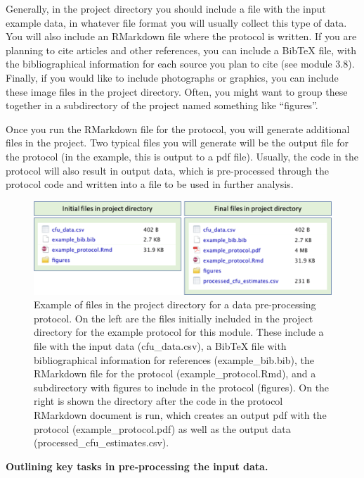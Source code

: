 \documentclass[]{tufte-book}
\begin{document}
Generally, in the project directory you should include a file with the input
example data, in whatever file format you will usually collect this type of
data. You will also include an RMarkdown file where the protocol is written. If
you are planning to cite articles and other references, you can include a BibTeX
file, with the bibliographical information for each source you plan to cite (see module 3.8).
Finally, if you would like to include photographs or graphics, you can include
these image files in the project directory. Often, you might want to group these
together in a subdirectory of the project named something like ``figures''.

Once you run the RMarkdown file for the protocol, you will generate additional
files in the project. Two typical files you will generate will be the output
file for the protocol (in the example, this is output to a pdf file). Usually,
the code in the protocol will also result in output data, which is pre-processed
through the protocol code and written into a file to be used in further
analysis.

\begin{figure}
\includegraphics[width=\textwidth]{figures/protocol_project_files} \caption[Example of files in the project directory for a data pre-processing protocol]{Example of files in the project directory for a data pre-processing protocol. On the left are the files initially included in the project directory for the example protocol for this module. These include a file with the input data (cfu\_data.csv), a BibTeX file with bibliographical information for references (example\_bib.bib), the RMarkdown file for the protocol (example\_protocol.Rmd), and a subdirectory with figures to include in the protocol (figures). On the right is shown the directory after the code in the protocol RMarkdown document is run, which creates an output pdf with the protocol (example\_protocol.pdf) as well as the output data (processed\_cfu\_estimates.csv).}\label{fig:protocolprojectfiles}
\end{figure}

\textbf{Outlining key tasks in pre-processing the input data.}
\end{document}
